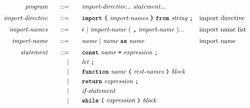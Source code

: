 \documentclass[a4paper]{article}
\begin{document}
\addtolength{\jot}{-0.5mm}
\begin{alignat*}{9}
&& \textit{program}    &&\quad ::= &\quad && \textit{import-directive} ... \ \textit{statement} ...
                                                            \\[1mm]
&& \textit{import-directive}    &&\quad ::= &\quad && \textbf{\texttt{import}}\ \textbf{\texttt{\{}}\ \textit{import-names} \ \textbf{\texttt{\}}}\ \textbf{\texttt{from}}\  \textit{string} \ \textbf{\texttt{;}}
                                                           && \textrm{import directive} \\[1mm]
&& \textit{import-names}   && ::= &\quad &&  \epsilon\ | \  \textit{import-name} \ 
                                                   (\ \textbf{\texttt{,}} \ \textit{import-name}\ ) ...
                                                            && \textrm{import name list}   \\[1mm]
&& \textit{import-name}   && ::= &\quad &&  \textit{name}\ | \  \textit{name} \ \textbf{\texttt{as}}\ \textit{name} 
                                                            && \textrm{import name}   \\[1mm]
&& \textit{statement}    &&\quad ::= &\quad && \textbf{\texttt{const}}\  \textit{name} \ 
                                           \textbf{\texttt{=}}\  \textit{expression} \ \textbf{\texttt{;}}
                                                            \\
&&                       && |   &\quad && \textit{let} \ \textbf{\texttt{;}}
                                                            \\
&&                       && |   &\quad && \textbf{\texttt{function}}\  \textit{name} \ 
                                   \textbf{\texttt{(}}\  \textit{rest-names} \ \textbf{\texttt{)}}\ \textit{block} \quad
                                                           \\
&&                       && |   &\quad && \textbf{\texttt{return}}\  \textit{expression} \ \textbf{\texttt{;}}
                                                           \\
&&                       && |   &\quad && \textit{if-statement} \quad
                                                           \\
&&                       && |   &\quad && \textbf{\texttt{while}}\  
                                   \textbf{\texttt{(}}\  \textit{expression} \ \textbf{\texttt{)}} \
                                   \textit{block}

\end{alignat*}
\end{document}
